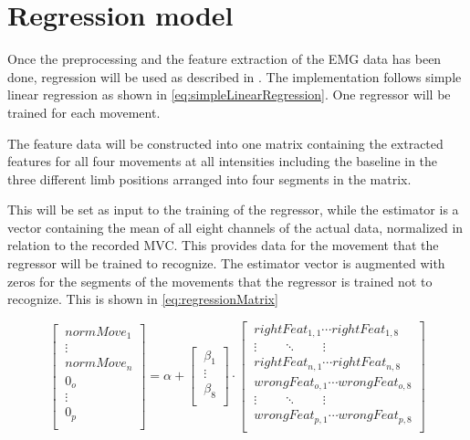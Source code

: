 \section{Regression model}


Once the preprocessing and the feature extraction of the EMG data has been done, regression will be used as described in . The implementation follows simple linear regression as shown in \eqref{eq:simpleLinearRegression}. One regressor will be trained for each movement. 


The feature data will be constructed into one matrix containing the extracted features for all four movements at all intensities including the baseline in the three different limb positions arranged into four segments in the matrix. 

This will be set as input to the training of the regressor, while the estimator is a vector containing the mean of all eight channels of the actual data, normalized in relation to the recorded MVC. This provides data for the movement that the regressor will be trained to recognize. The estimator vector is augmented with zeros for the segments of the movements that the regressor is trained not to recognize. This is shown in \eqref{eq:regressionMatrix}

\begin{equation} \label{eq:regressionMatrix}
\begin{bmatrix} 
\ normMove_1 \\ 
\ \vdots\\
\ normMove_n\\
\ 0_o\\
\ \vdots\\
\ 0_p\\
\end{bmatrix}=
\alpha +
\begin{bmatrix}
\ \beta_1\\
\ \vdots\\
\ \beta_8\\
\end{bmatrix} \cdot
\begin{bmatrix} 
\ rightFeat_{1,1} \cdots rightFeat_{1,8} \\ 
\ \vdots \qquad \ddots \qquad \vdots \\
\ rightFeat_{n,1} \cdots rightFeat_{n,8} \\
\ wrongFeat_{o,1} \cdots wrongFeat_{o,8} \\
\ \vdots \qquad \ddots \qquad \vdots \\
\ wrongFeat_{p,1} \cdots wrongFeat_{p,8} \\
\end{bmatrix}
\end{equation}

